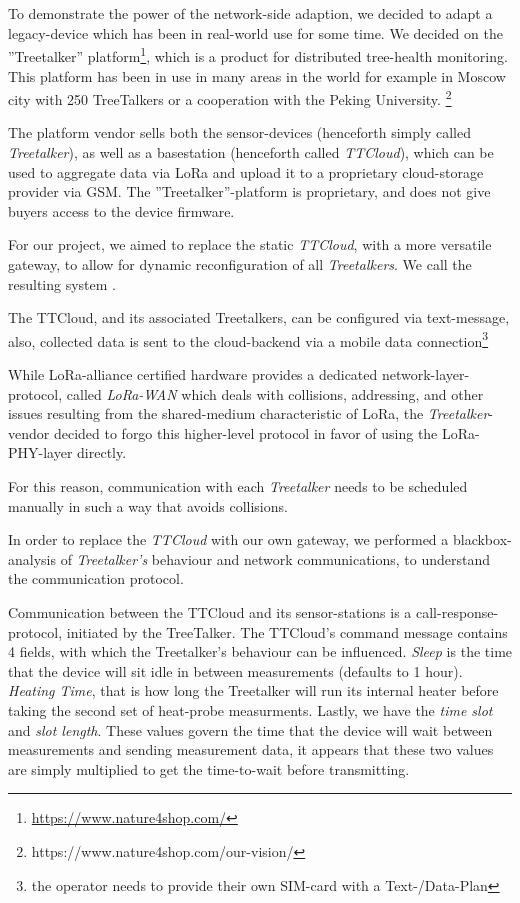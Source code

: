 \section{\ttt}
\label{sec:treetalker}

To demonstrate the power of the network-side adaption, we decided to adapt a legacy-device which has been in real-world use for some time.
We decided on the ''Treetalker'' platform\footnote{\url{https://www.nature4shop.com/}}, which is a product for distributed tree-health monitoring.
This platform has been in use in many areas in the world for example in Moscow city with 250 TreeTalkers or a cooperation with the Peking University. \footnote{https://www.nature4shop.com/our-vision/}

The platform vendor sells both the sensor-devices (henceforth simply called \textit{Treetalker}), as well as a basestation (henceforth called \textit{TTCloud}), which can be used to aggregate data via LoRa and upload it to a proprietary cloud-storage provider via GSM.
The ''Treetalker''-platform is proprietary, and does not give buyers access to the device firmware.

For our project, we aimed to replace the static \textit{TTCloud}, with a more versatile gateway, to allow for dynamic reconfiguration of all \textit{Treetalkers}.
We call the resulting system \ttt.

The TTCloud, and its associated Treetalkers, can be configured via text-message, also, collected data is sent to the cloud-backend via a mobile data connection\footnote{the operator needs to provide their own SIM-card with a Text-/Data-Plan}

While LoRa-alliance certified hardware provides a dedicated network-layer-protocol, called \textit{LoRa-WAN} which deals with collisions, addressing, and other issues resulting from the shared-medium characteristic of LoRa, the \textit{Treetalker}-vendor decided to forgo this higher-level protocol in favor of using the LoRa-PHY-layer directly.

For this reason, communication with each \textit{Treetalker} needs to be scheduled manually in such a way that avoids collisions.

In order to replace the \textit{TTCloud} with our own gateway, we performed a blackbox-analysis of \textit{Treetalker's} behaviour and network communications, to understand the communication protocol.

Communication between the TTCloud and its sensor-stations is a call-response-protocol, initiated by the TreeTalker.
The TTCloud's command message contains 4 fields, with which the Treetalker's behaviour can be influenced.
\textit{Sleep} is the time that the device will sit idle in between measurements (defaults to 1 hour).
\textit{Heating Time}, that is how long the Treetalker will run its internal heater before taking the second set of heat-probe measurments.
Lastly, we have the \textit{time slot} and \textit{slot length}.
These values govern the time that the device will wait between measurements and sending measurement data, it appears that these two values are simply multiplied to get the time-to-wait before transmitting.

